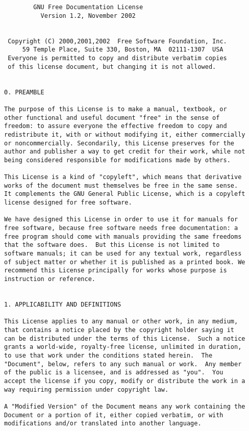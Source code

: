 \begin{verbatim}
        GNU Free Documentation License
          Version 1.2, November 2002


 Copyright (C) 2000,2001,2002  Free Software Foundation, Inc.
     59 Temple Place, Suite 330, Boston, MA  02111-1307  USA
 Everyone is permitted to copy and distribute verbatim copies
 of this license document, but changing it is not allowed.


0. PREAMBLE

The purpose of this License is to make a manual, textbook, or
other functional and useful document "free" in the sense of
freedom: to assure everyone the effective freedom to copy and
redistribute it, with or without modifying it, either commercially
or noncommercially. Secondarily, this License preserves for the
author and publisher a way to get credit for their work, while not
being considered responsible for modifications made by others.

This License is a kind of "copyleft", which means that derivative
works of the document must themselves be free in the same sense.
It complements the GNU General Public License, which is a copyleft
license designed for free software.

We have designed this License in order to use it for manuals for
free software, because free software needs free documentation: a
free program should come with manuals providing the same freedoms
that the software does.  But this License is not limited to
software manuals; it can be used for any textual work, regardless
of subject matter or whether it is published as a printed book. We
recommend this License principally for works whose purpose is
instruction or reference.


1. APPLICABILITY AND DEFINITIONS

This License applies to any manual or other work, in any medium,
that contains a notice placed by the copyright holder saying it
can be distributed under the terms of this License.  Such a notice
grants a world-wide, royalty-free license, unlimited in duration,
to use that work under the conditions stated herein.  The
"Document", below, refers to any such manual or work.  Any member
of the public is a licensee, and is addressed as "you".  You
accept the license if you copy, modify or distribute the work in a
way requiring permission under copyright law.

A "Modified Version" of the Document means any work containing the
Document or a portion of it, either copied verbatim, or with
modifications and/or translated into another language.


\end{verbatim}
